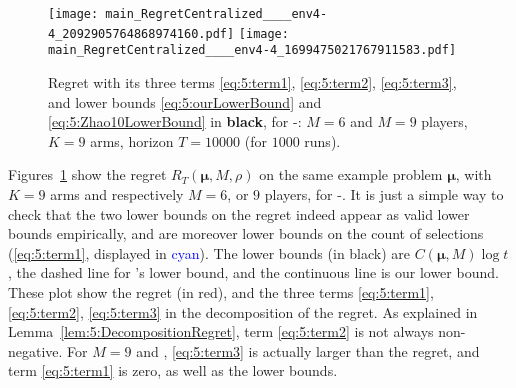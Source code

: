 %
%
\begin{figure}[!h]
    \centering
        \texttt{[image: main\_RegretCentralized\_\_\_\_env4-4\_2092905764868974160.pdf]}
        \texttt{[image: main\_RegretCentralized\_\_\_\_env4-4\_1699475021767911583.pdf]}
    \caption[Multi-player regret with its three terms]{Regret with its three terms \ref{eq:5:term1}, \ref{eq:5:term2}, \ref{eq:5:term3}, and lower bounds \eqref{eq:5:ourLowerBound} and \eqref{eq:5:Zhao10LowerBound} in \textbf{black}, for \Selfish-\klUCB: $M=6$ and $M=9$ players, $K=9$ arms, horizon $T=10000$ (for $1000$ runs).}
    \label{fig:5:MP__M9_K9_T10000_N1000__9_algos__main_RegretCentralized____env6}
\end{figure}



Figures~\ref{fig:5:MP__M9_K9_T10000_N1000__9_algos__main_RegretCentralized____env6}
show the regret $R_T(\boldsymbol{\mu}, M, \rho)$
on the same example problem $\boldsymbol{\mu}$, with $K = 9$ arms and respectively $M = 6$, or $9$ players, for \Selfish-\klUCB.
%
It is just a simple way to check that the two lower bounds on the regret indeed appear as valid lower bounds empirically,
and are moreover lower bounds on the count of selections (\ref{eq:5:term1}, displayed in \textcolor{blue}{cyan}).
%
The lower bounds (in black) are $C(\boldsymbol{\mu}, M) \log t$, the dashed line
for \citeauthor{Zhao10}'s lower bound, and the continuous line is our lower bound.
%
These plot show the regret (in red),
and the three terms \ref{eq:5:term1}, \ref{eq:5:term2}, \ref{eq:5:term3} in the decomposition of the regret.
As explained in Lemma~\ref{lem:5:DecompositionRegret}, term \ref{eq:5:term2} is not always non-negative.
For $M=9$ and \Selfish, \ref{eq:5:term3} is actually larger than the regret,
and term \ref{eq:5:term1} is zero, as well as the lower bounds.



